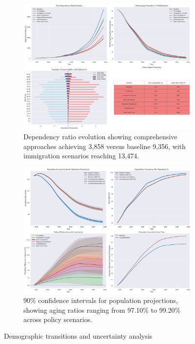 \documentclass{article} %
\begin{document}
\begin{figure}[t]
    \centering
    \begin{subfigure}[b]{0.48\textwidth}
        \includegraphics[width=\textwidth]{demographic_transition.png}
        \caption{Dependency ratio evolution showing comprehensive approaches achieving 3,858 versus baseline 9,356, with immigration scenarios reaching 13,474.}
        \label{fig:demographic}
    \end{subfigure}
    \hfill
    \begin{subfigure}[b]{0.48\textwidth}
        \includegraphics[width=\textwidth]{uncertainty_analysis.png}
        \caption{90\% confidence intervals for population projections, showing aging ratios ranging from 97.10\% to 99.20\% across policy scenarios.}
        \label{fig:uncertainty}
    \end{subfigure}
    \caption{Demographic transitions and uncertainty analysis}
    \label{fig:additional_results}
\end{figure}
\end{document}
